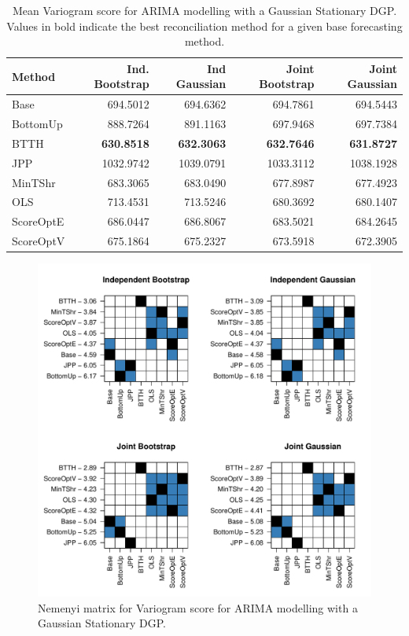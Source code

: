 \documentclass[12pt]{article}
\theoremstyle{definition}
\begin{document}
\begin{table}[H]
	\caption{\label{tab:gsv}Mean Variogram score for ARIMA 
		modelling with a Gaussian Stationary DGP.  Values in bold indicate the best reconciliation method for a given base forecasting method.}
	\centering
	\begin{tabular}[t]{l|r|r|r|r}
		\hline
		Method & Ind. Bootstrap & Ind Gaussian & Joint Bootstrap & Joint Gaussian\\
		\hline
		Base & 694.5012 & 694.6362 & 694.7861 & 694.5443\\
		\hline
		BottomUp & 888.7264 & 891.1163 & 697.9468 & 697.7384\\
		\hline
		BTTH & \textbf{630.8518} & \textbf{632.3063} & \textbf{632.7646} & \textbf{631.8727}\\
		\hline
		JPP & 1032.9742 & 1039.0791 & 1033.3112 & 1038.1928\\
		\hline
		MinTShr & 683.3065 & 683.0490 & 677.8987 & 677.4923\\
		\hline
		OLS & 713.4531 & 713.5246 & 680.3692 & 680.1407\\
		\hline
		ScoreOptE & 686.0447 & 686.8067 & 683.5021 & 684.2645\\
		\hline
		ScoreOptV & 675.1864 & 675.2327 & 673.5918 & 672.3905\\
		\hline
	\end{tabular}
\end{table}

\begin{figure}[H]
	\includegraphics[width=.95\textwidth]{Figs/gsv.pdf}
	\caption{Nemenyi matrix for Variogram score for ARIMA 
		modelling with a Gaussian Stationary DGP.}
	\label{fig:gsv}
	
\end{figure}	
\end{document}
